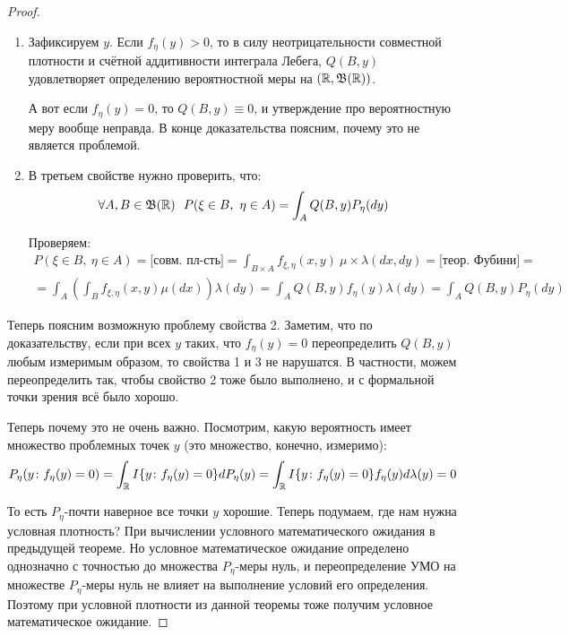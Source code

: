 \begin{proof}
\begin{enumerate}
        \item Зафиксируем $y$. Если $f_\eta(y) > 0$, то в силу неотрицательности совместной плотности и счётной аддитивности интеграла Лебега, $Q(B, y)$ удовлетворяет определению вероятностной меры на $(\mathbb{R}, \mathfrak{B}(\mathbb{R}))$.

        А вот если $f_\eta(y) = 0$, то $Q(B, y) \equiv 0$, и утверждение про вероятностную меру вообще неправда. В конце доказательства поясним, почему это не является проблемой.
        
        \item В третьем свойстве нужно проверить, что:
        \[
            \forall A, B \in \mathfrak{B}(\mathbb{R}) \ \ P(\xi \in B,\ \eta \in A) = \int_A Q(B, y) P_\eta(dy)
        \]

        Проверяем:
        \begin{multline*}
            P(\xi \in B,\ \eta \in A) = \text{[совм. пл-сть]} = \int_{B \times A} f_{\xi, \eta}(x, y) \ \mu \times \lambda (dx, dy) = \text{[теор. Фубини]} =
            \\
            = \int_A \left( \int_B f_{\xi, \eta}(x, y) \mu(dx) \right) \lambda(dy) = \int_A Q(B, y) f_\eta(y) \lambda(dy) = \int_A Q(B, y) P_\eta(dy)
        \end{multline*}
    \end{enumerate}

    Теперь поясним возможную проблему свойства 2. Заметим, что по доказательству, если при всех $y$ таких, что $f_\eta(y) = 0$ переопределить $Q(B, y)$ любым измеримым образом, то свойства 1 и 3 не нарушатся. В частности, можем переопределить так, чтобы свойство 2 тоже было выполнено, и с формальной точки зрения всё было хорошо.

    Теперь почему это не очень важно. Посмотрим, какую вероятность имеет множество проблемных точек $y$ (это множество, конечно, измеримо):
    \[
        P_\eta(y \colon f_\eta(y) = 0) = \int_{\mathbb{R}} I\{y \colon f_\eta(y) = 0\} dP_\eta(y) = \int_{\mathbb{R}} I\{y \colon f_\eta(y) = 0\} f_\eta(y) d\lambda(y) = 0
    \]

    То есть $P_\eta$-почти наверное все точки $y$ хорошие. Теперь подумаем, где нам нужна условная плотность? При вычислении условного математического ожидания в предыдущей теореме. Но условное математическое ожидание определено однозначно с точностью до множества $P_\eta$-меры нуль, и переопределение УМО на множестве $P_\eta$-меры нуль не влияет на выполнение условий его определения. Поэтому при условной плотности из данной теоремы тоже получим условное математическое ожидание.
\end{proof}